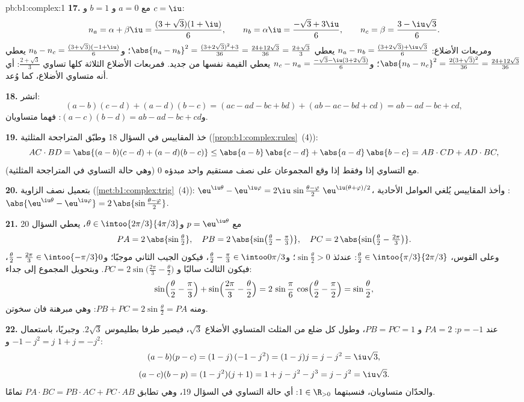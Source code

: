 \begin{solution}{pb:b1:complex:1}
\textbf{17.} مع $a = 0$ و $b = 1$ و $c = \iu$:
\[
n_a = \alpha + \beta\iu = \frac{(3 + \sqrt3)(1 + \iu)}6,
\qquad
n_b = \alpha\iu = \frac{-\sqrt3 + 3\iu}6,
\qquad
n_c = \beta = \frac{3 - \iu\sqrt3}6 .
\]
ومربعات الأضلاع: $n_a - n_b = \frac{(3 + 2\sqrt3) +
\iu\sqrt3}6$ يعطي $\abs{n_a - n_b}^2 = \frac{(3 + 2\sqrt3)^2 +
3}{36} = \frac{24 + 12\sqrt3}{36} = \frac{2 + \sqrt3}3$؛ و$n_b -
n_c = \frac{(3 + \sqrt3)(-1 + \iu)}6$ يعطي $\abs{n_b - n_c}^2 =
\frac{2(3 + \sqrt3)^2}{36} = \frac{24 + 12\sqrt3}{36}$؛ و$n_c - n_a
= \frac{-\sqrt3 - \iu(3 + 2\sqrt3)}6$ يعطي القيمة نفسها من جديد.
فمربعات الأضلاع الثلاثة كلها تساوي $\frac{2 + \sqrt3}3$: أي أنه متساوي الأضلاع،
كما وُعد.

\textbf{18.} انشر:
\[
(a - b)(c - d) + (a - d)(b - c)
= (ac - ad - bc + bd) + (ab - ac - bd + cd)
= ab - ad - bc + cd ,
\]
و$(a - c)(b - d) = ab - ad - bc + cd$: فهما متساويان.

\textbf{19.} خذ المقاييس في السؤال 18 وطبّق المتراجحة
المثلثية (\cref{prop:b1:complex:rules}~(4)):
\[
AC \cdot BD = \abs{(a-b)(c-d) + (a-d)(b-c)}
\leq \abs{a-b}\,\abs{c-d} + \abs{a-d}\,\abs{b-c}
= AB \cdot CD + AD \cdot BC ,
\]
مع التساوي إذا وفقط إذا وقع المجموعان على نصف مستقيم واحد مبدؤه $0$
(وهي حالة التساوي في المتراجحة المثلثية).

\textbf{20.} بتعميل نصف الزاوية
(\cref{met:b1:complex:trig}~(4)):
$\eu^{\iu\theta} - \eu^{\iu\varphi} = 2\iu\,\sin\frac{\theta -
\varphi}2\;\eu^{\iu(\theta + \varphi)/2}$، وأخذ المقاييس يُلغي
العوامل الأحادية : $\abs{\eu^{\iu\theta} - \eu^{\iu\varphi}}
= 2\,\abs{\sin\frac{\theta - \varphi}2}$.

\textbf{21.} مع $p = \eu^{\iu\theta}$ و$\theta \in
\intoo{2\pi/3}{4\pi/3}$، يعطي السؤال 20
\[
PA = 2\,\abs{\sin\tfrac\theta2},
\quad
PB = 2\,\abs{\sin\bigl(\tfrac\theta2 - \tfrac\pi3\bigr)},
\quad
PC = 2\,\abs{\sin\bigl(\tfrac\theta2 - \tfrac{2\pi}3\bigr)} .
\]
وعلى القوس، $\frac\theta2 \in \intoo{\pi/3}{2\pi/3}$: عندئذ
$\sin\frac\theta2 > 0$؛ و$\frac\theta2 - \frac\pi3 \in
\intoo0{\pi/3}$، فيكون الجيب الثاني موجبًا؛ و$\frac\theta2 -
\frac{2\pi}3 \in \intoo{-\pi/3}0$، فيكون الثالث سالبًا و
$PC = 2\sin\bigl(\frac{2\pi}3 - \frac\theta2\bigr)$. وبتحويل المجموع إلى
جداء:
\[
\sin\Bigl(\frac\theta2 - \frac\pi3\Bigr) +
\sin\Bigl(\frac{2\pi}3 - \frac\theta2\Bigr)
= 2\,\sin\frac\pi6\,\cos\Bigl(\frac\theta2 - \frac\pi2\Bigr)
= \sin\frac\theta2 ,
\]
ومنه $PB + PC = 2\sin\frac\theta2 = PA$: وهي مبرهنة فان سخوتن.

\textbf{22.} عند $p = -1$: $PA = 2$ و $PB = PC = 1$، وطول كل ضلع من
المثلث المتساوي الأضلاع $\sqrt3$، فيصير طرفا
بطليموس $2\sqrt3$. وجبريًا، باستعمال $-1 - j^2 = j$ و
$1 + j = -j^2$:
\[
(a - b)(p - c) = (1 - j)\,(-1 - j^2) = (1 - j)j = j - j^2
= \iu\sqrt3 ,
\]
\[
(a - c)(b - p) = (1 - j^2)(j + 1) = 1 + j - j^2 - j^3
= j - j^2 = \iu\sqrt3 .
\]
والحدّان متساويان، فنسبتهما
$1 \in \R_{>0}$: أي حالة التساوي في السؤال 19، وهي تطابق $PA
\cdot BC = PB \cdot AC + PC \cdot AB$ تمامًا.


\end{solution}
